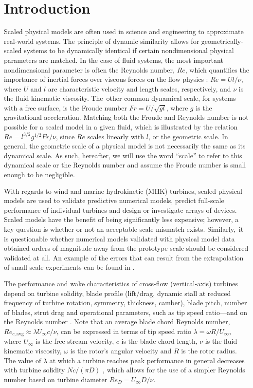 \documentclass[energies,article,accept,moreauthors,pdftex,10pt,a4paper]{mdpi}
\theoremstyle{mdpi}
\newcounter{ex}
\newcounter{re}
\begin{document}
\section{Introduction}

Scaled physical models are often used in science and engineering to approximate
real-world systems. The principle of dynamic similarity allows for
geometrically-scaled systems to be dynamically identical if certain
nondimensional physical parameters are matched. In the case of fluid systems,
the most important nondimensional parameter is often the Reynolds number, $Re$,
which quantifies the importance of inertial forces over viscous forces on the
flow physics \cite{Acheson1990}: $Re = Ul/\nu$, where $U$ and $l$ are
characteristic velocity and length scales, respectively, and $\nu$ is the fluid
kinematic viscosity. The~other common dynamical scale, for systems with a free
surface, is the Froude number $Fr = U/\sqrt{gl}$, where $g$ is the gravitational
acceleration. Matching both the Froude and Reynolds number is not possible for a
scaled model in a given fluid, which is illustrated by the relation $Re =
l^{3/2} g^{1/2} Fr / \nu$, since $Re$ scales linearly with $l$, or the geometric
scale. In general, the geometric scale of a physical model is not necessarily
the same as its dynamical scale. As such, hereafter, we will use the word
``scale'' to refer to this dynamical scale or the Reynolds number and assume the
Froude number is small enough to be negligible.

With regards to wind and marine hydrokinetic (MHK) turbines, scaled physical
models are used to validate predictive numerical models, predict full-scale
performance of individual turbines and design or investigate arrays of devices.
Scaled models have the benefit of being significantly less expensive; however, a
key question is whether or not an acceptable scale mismatch exists. Similarly,~it is questionable whether numerical models validated with physical model data
obtained orders of magnitude away from the prototype scale should be considered
validated at all. An example of the errors that can result from the
extrapolation of small-scale experiments can be found in \cite{Baker1991}.

The performance and wake characteristics of cross-flow (vertical-axis) turbines
depend on turbine solidity, blade profile (lift/drag, dynamic stall at reduced
frequency of turbine rotation, symmetry, thickness, camber), blade pitch, number
of blades, strut drag and operational parameters, such as tip speed ratio---and
on the Reynolds number \cite{Para2002}. Note that an average blade chord
Reynolds number, $Re_{c,\mathrm{avg}} \approx \lambda U_\infty c/ \nu$, can be
expressed in terms of tip speed ratio $\lambda = \omega R/ U_\infty$, where
$U_\infty$ is the free stream velocity, $c$ is the blade chord length, $\nu$ is
the fluid kinematic viscosity, $\omega$ is the rotor's angular velocity and $R$
is the rotor radius. The value of $\lambda$ at which a turbine reaches peak
performance in general decreases with turbine solidity $Nc/(\pi D)$
\cite{Templin1974}, which allows for the use of a simpler Reynolds number based
on turbine diameter $Re_D = U_\infty D/\nu$.
\end{document}
